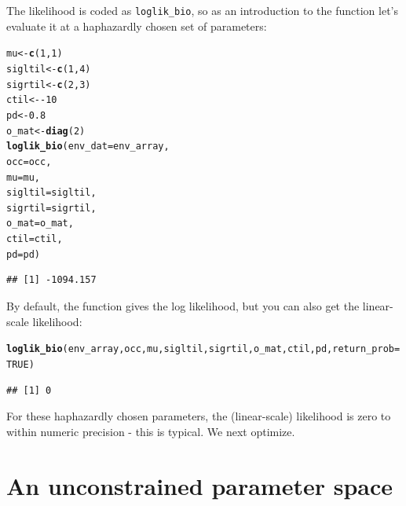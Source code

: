 \documentclass[11pt]{article}\usepackage[]{graphicx}\usepackage[]{xcolor}
\makeatletter
\newcommand{\hlnum}[1]{\textcolor[rgb]{0.686,0.059,0.569}{#1}}%
\newcommand{\hlopt}[1]{\textcolor[rgb]{0,0,0}{#1}}%
\newcommand{\hldef}[1]{\textcolor[rgb]{0.345,0.345,0.345}{#1}}%
\newcommand{\hlkwb}[1]{\textcolor[rgb]{0.69,0.353,0.396}{#1}}%
\newcommand{\hlkwc}[1]{\textcolor[rgb]{0.333,0.667,0.333}{#1}}%
\newcommand{\hlkwd}[1]{\textcolor[rgb]{0.737,0.353,0.396}{\textbf{#1}}}%
\newenvironment{kframe}{%
 \def\at@end@of@kframe{}%
 \ifinner\ifhmode%
  \def\at@end@of@kframe{\end{minipage}}%
  \begin{minipage}{\columnwidth}%
 \fi\fi%
 \def\FrameCommand##1{\hskip\@totalleftmargin \hskip-\fboxsep
 \colorbox{shadecolor}{##1}\hskip-\fboxsep
     \hskip-\linewidth \hskip-\@totalleftmargin \hskip\columnwidth}%
 \MakeFramed {\advance\hsize-\width
   \@totalleftmargin\z@ \linewidth\hsize
   \@setminipage}}%
 {\par\unskip\endMakeFramed%
 \at@end@of@kframe}
\newenvironment{knitrout}{}{} %
\makeatother
\begin{document}
The likelihood is coded as \texttt{loglik\_bio}, so as an introduction to the function 
let's evaluate it at a haphazardly chosen set of parameters:
\begin{knitrout}
\color{fgcolor}\begin{kframe}
\begin{alltt}
\hldef{mu} \hlkwb{<-} \hlkwd{c}\hldef{(}\hlnum{1}\hldef{,}\hlnum{1}\hldef{)}
\hldef{sigltil} \hlkwb{<-} \hlkwd{c}\hldef{(}\hlnum{1}\hldef{,}\hlnum{4}\hldef{)}
\hldef{sigrtil} \hlkwb{<-} \hlkwd{c}\hldef{(}\hlnum{2}\hldef{,}\hlnum{3}\hldef{)}
\hldef{ctil} \hlkwb{<-} \hlopt{-}\hlnum{10}
\hldef{pd} \hlkwb{<-} \hlnum{0.8}
\hldef{o_mat} \hlkwb{<-} \hlkwd{diag}\hldef{(}\hlnum{2}\hldef{)}
\hlkwd{loglik_bio}\hldef{(}\hlkwc{env_dat} \hldef{= env_array,}
           \hlkwc{occ} \hldef{= occ,}
           \hlkwc{mu} \hldef{= mu,}
           \hlkwc{sigltil} \hldef{= sigltil,}
           \hlkwc{sigrtil} \hldef{= sigrtil,}
           \hlkwc{o_mat} \hldef{= o_mat,}
           \hlkwc{ctil} \hldef{= ctil,}
           \hlkwc{pd} \hldef{= pd)}
\end{alltt}
\begin{verbatim}
## [1] -1094.157
\end{verbatim}
\end{kframe}
\end{knitrout}
\noindent By default, the function gives the log likelihood, but you can also get the linear-scale
likelihood:
\begin{knitrout}
\color{fgcolor}\begin{kframe}
\begin{alltt}
\hlkwd{loglik_bio}\hldef{(env_array,occ,mu,sigltil,sigrtil,o_mat,ctil,pd,}\hlkwc{return_prob}\hldef{=}\hlnum{TRUE}\hldef{)}
\end{alltt}
\begin{verbatim}
## [1] 0
\end{verbatim}
\end{kframe}
\end{knitrout}
\noindent For these haphazardly chosen parameters, the (linear-scale) likelihood is zero to within 
numeric precision - this is typical. We next optimize.
 
\section{An unconstrained parameter space}
 
\end{document}
